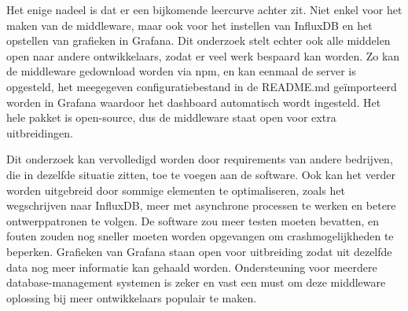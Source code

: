 Het enige nadeel is dat er een bijkomende leercurve achter zit. Niet enkel voor het maken van de middleware, maar ook voor het instellen van InfluxDB en het opstellen van grafieken in Grafana. Dit onderzoek stelt echter ook alle middelen open naar andere ontwikkelaars, zodat er veel werk bespaard kan worden. Zo kan de middleware gedownload worden via npm, en kan eenmaal de server is opgesteld, het meegegeven configuratiebestand in de README.md geïmporteerd worden in Grafana waardoor het dashboard automatisch wordt ingesteld. Het hele pakket is open-source, dus de middleware staat open voor extra uitbreidingen.

Dit onderzoek kan vervolledigd worden door requirements van andere bedrijven, die in dezelfde situatie zitten, toe te voegen aan de software. Ook kan het verder worden uitgebreid door sommige elementen te optimaliseren, zoals het wegschrijven naar InfluxDB, meer met asynchrone processen te werken en betere ontwerppatronen te volgen. De software zou meer testen moeten bevatten, en fouten zouden nog sneller moeten worden opgevangen om crashmogelijkheden te beperken. Grafieken van Grafana staan open voor uitbreiding zodat uit dezelfde data nog meer informatie kan gehaald worden. Ondersteuning voor meerdere database-management systemen is zeker en vast een must om deze middleware oplossing bij meer ontwikkelaars populair te maken.

